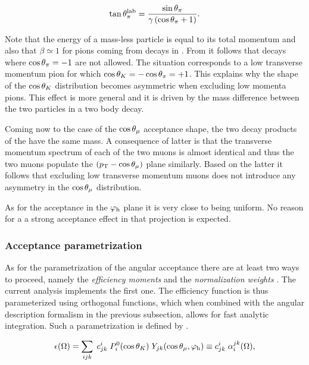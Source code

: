 \begin{equation}
  \centering
  \tan\thetapi^\lab = \frac{\sin\thetapi}{\gamma\parenthesis{\cos\thetapi + 1} }.
  \label{pi_angle_massless}
\end{equation}

\noindent Note that the energy of a mass-less particle is equal to its total momentum and also that $\beta \simeq 1$
for pions coming from \BJpsiKpi decays in \lhcb. From  it follows that decays where $\cos\theta_{\pi}=-1$
are not allowed. The situation corresponds to a low transverse momentum pion for which $\cos\theta_{K} = -\cos\theta_{\pi} = +1$.
This explains why the shape of the $\cos\theta_{K}$ distribution becomes asymmetric when excluding low momenta pions.
This effect is more general and it is driven by the mass difference between the two particles in a two body decay.

Coming now to the case of the $\cos\theta_{\mu}$ acceptance shape, the two decay products of the \jpsi have
the same mass. A consequence of latter is that the transverse momentum spectrum of each of the two muons
is almost identical and thus the two muons populate the $(\mbox{$p_{\rm T}$}-\cos\theta_{\mu})$ plane similarly.
Based on the latter it follows that excluding low transverse momentum muons does not introduce any asymmetry
in the $\cos\theta_{\mu}$ distribution.

As for the acceptance in the ${\varphi_{\text h}}$ plane it is very close to being uniform.
No reason for a a strong acceptance effect in that projection is expected.

\subsubsection{Acceptance parametrization}
\label{Acceptance parametrization}
As for the parametrization of the angular acceptance there are at least two ways to proceed,
namely the \emph{efficiency moments} \cite{jeroenThesis} and the \emph{normalization weights} \cite{tristanThesis,jeroenThesis}.
The current analysis implements the first one. The efficiency function is thus parameterized using orthogonal functions,
which when combined with the angular description formalism in the previous subsection, allows for fast analytic
integration. Such a parametrization is defined by .

\begin{equation}
  \centering
  \epsilon(\Omega) = \sum_{ijk} \; \moment{i}{j}{k} \; P_i^0(\cos\thetaK) \; Y_{jk}(\cos\thetamu,\phihel) \equiv \moment{i}{j}{k} \; \effbase,
  \label{eff_func}
\end{equation}

